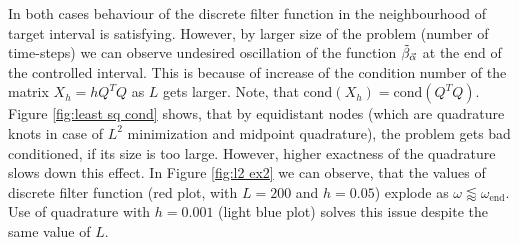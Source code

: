 \documentclass[a4paper,11pt,bibliography=totoc,listof=totoc,headinclude=true,cleardoublepage=empty,oneside]{scrbook}
\newcommand{\dffv}{\Tilde{\beta}_{\Vec{\alpha}}}
\newcommand{\e}{\mathrm{end}}
\begin{document}
In both cases behaviour of the discrete filter function in the neighbourhood of target interval is satisfying. However, by larger size of the problem (number of time-steps) we can observe undesired oscillation of the function $\dffv$ at the end of the controlled interval. This is because of increase of the condition number of the matrix $X_h = hQ^TQ$ as $L$ gets larger. Note, that $\mathrm{cond}(X_h) = \mathrm{cond}(Q^TQ)$. Figure \ref{fig:least sq cond} shows, that by equidistant nodes (which are quadrature knots in case of $L^2$ minimization and midpoint quadrature), the problem gets bad conditioned, if its size is too large. However, higher exactness of the quadrature slows down this effect. In Figure \ref{fig:l2 ex2} we can observe, that the values of discrete filter function (red plot, with $L=200$ and $h=0.05$) explode as $\omega \lessapprox \omega_\e$. Use of quadrature with $h=0.001$ (light blue plot) solves this issue despite the same value of $L$.
\end{document}

